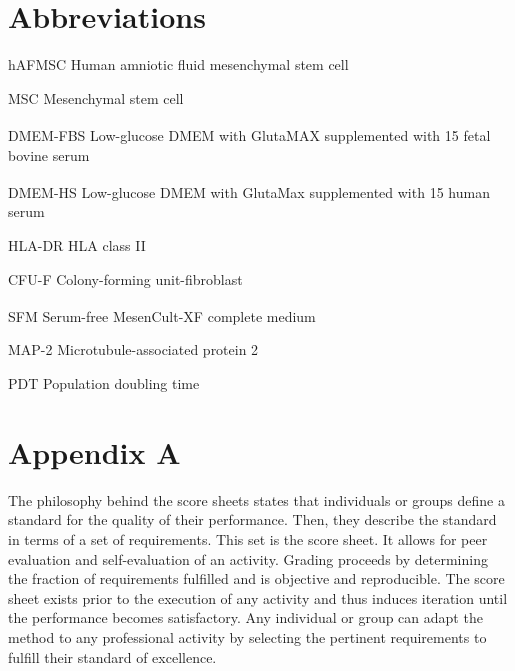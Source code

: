 \documentclass[numbers,sort&compress]{IntechOpen-Book}%
\begin{document}
\begin{backmatter}
\section*{Abbreviations}

\begin{abbrvlist}
	\item[hAFMSC] Human amniotic fluid mesenchymal stem cell
	\item[MSC] Mesenchymal stem cell
	\item[DMEM-FBS] Low-glucose DMEM with GlutaMAX\textsuperscript{\texttrademark} supplemented with 15%
	fetal bovine serum
	\item[DMEM-HS] Low-glucose DMEM with GlutaMax\textsuperscript{\texttrademark} supplemented with 15%
	human serum
	\item[HLA-DR] HLA class II
	\item[CFU-F] Colony-forming unit-fibroblast
	\item[SFM] Serum-free MesenCult\textsuperscript{\texttrademark}-XF complete medium
	\item[MAP-2] Microtubule-associated protein 2
	\item[PDT] Population doubling time
\end{abbrvlist}

\section*{Appendix A}
The philosophy behind the score sheets states that individuals or groups define
a standard for the quality of their performance. Then, they describe the standard in
terms of a set of requirements. This set is the score sheet. It allows for peer evaluation
and self-evaluation of an activity. Grading proceeds by determining the
fraction of requirements fulfilled and is objective and reproducible. The score sheet
exists prior to the execution of any activity and thus induces iteration until the
performance becomes satisfactory. Any individual or group can adapt the method
to any professional activity by selecting the pertinent requirements to fulfill their
standard of excellence.

\begin{authordetails}
	
	
	\author{Author 1$^{1,2*\dagger}$, Author 2$^{2\dagger}$ and Author 3$^3$}
	\address[1]{Institution No. 1, City, Country}
	\address[2]{Institution No. 2, City, Country}
	\address[3]{Institution No. 3, City, Country}
	\address{*Address all correspondence to: author1@inbox.com}
	\address{\dag\ These authors contributed equally}
	

\end{authordetails}
\end{backmatter}
\end{document}
